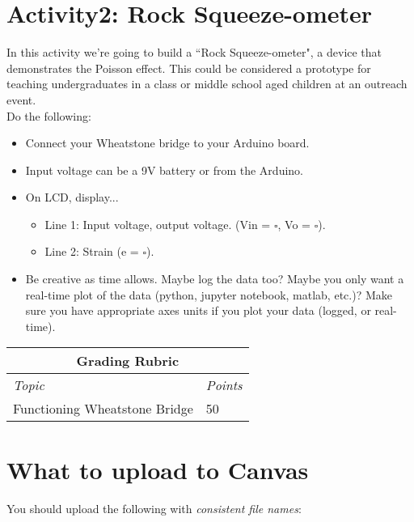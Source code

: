 \documentclass[10pt]{article}
\begin{document}
\section*{Activity2: Rock Squeeze-ometer}
In this activity we’re going to build a ``Rock Squeeze-ometer", a device that demonstrates the Poisson effect. This could be considered a prototype for teaching undergraduates in a class or middle school aged children at an outreach event. \\
Do the following:
\begin{itemize}
	\item Connect your Wheatstone bridge to your Arduino board. 
	\item Input voltage can be a 9V battery or from the Arduino.
	\item On LCD, display...
	\begin{itemize}
		\item Line 1: Input voltage, output voltage. (Vin = $ \square $, Vo = $ \square $).
		\item Line 2: Strain (e = $ \square $).
	\end{itemize}
\item Be creative as time allows. Maybe log the data too? Maybe you only want a real-time plot of the data (python, jupyter notebook, matlab, etc.)? Make sure you have appropriate axes units if you plot your data (logged, or real-time).
\end{itemize}

\begin{table}[h!]
	\footnotesize
	\centering
	\begin{tabular}{@{}ll@{}}
		\multicolumn{2}{c}{\textbf{Grading Rubric}} \\ \midrule 
		\multicolumn{1}{l}{\textit{Topic}}   & \textit{Points}   \\ \midrule 
		Functioning Wheatstone Bridge                   & 50       \\ \bottomrule
	\end{tabular}
\end{table}


\section*{What to upload to Canvas}
You should upload the following with \textit{consistent file names}:
\end{document}
